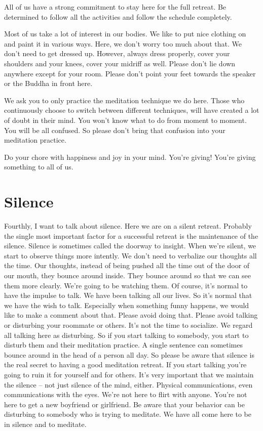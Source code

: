 \documentclass[letterpaper,10pt,english]{sphinxmanual}
\begin{document}
\sphinxAtStartPar
All of us have a strong commitment to stay here for the full retreat. Be
determined to follow all the activities and follow the schedule completely.

\sphinxAtStartPar
Most of us take a lot of interest in our bodies. We like to put nice clothing on and paint it in various ways. Here, we don’t worry too much about
that. We don’t need to get dressed up. However, always dress properly, cover
your shoulders and your knees, cover your midriff as well. Please don’t lie
down anywhere except for your room. Please don’t point your feet towards
the speaker or the Buddha in front here.

\sphinxAtStartPar
We  ask  you  to  only  practice  the  meditation  technique  we  do  here.
Those who continuously choose to switch between different techniques, will
have created a lot of doubt in their mind. You won’t know what to do from
moment to moment. You will be all confused. So please don’t bring that confusion into your meditation practice.

\sphinxAtStartPar
Do  your  chore  with  happiness  and  joy  in  your  mind. You’re  giving!
You’re giving something to all of us.


\section{Silence}
\label{\detokenize{0-a:silence}}
\sphinxAtStartPar
Fourthly, I want to talk about silence. Here we are on a silent retreat.
Probably the single most important factor for a successful retreat is the maintenance of the silence. Silence is sometimes called the doorway to insight.
When we’re silent, we start to observe things more intently. We don’t need
to verbalize our thoughts all the time. Our thoughts, instead of being pushed
all the time out of the door of our mouth, they bounce around inside. They
bounce around so that we can see them more clearly. We’re going to be watching them. Of course, it’s normal to have the impulse to talk. We have been
talking all our lives. So it’s normal that we have the wish to talk. Especially
when something funny happens, we would like to make a comment about
that. Please avoid doing that. Please avoid talking or disturbing your roommate or others. It’s not the time to socialize. We regard all talking here as
disturbing. So if you start talking to somebody, you start to disturb them and
their meditation practice. A single sentence can sometimes bounce around
   in the head of a person all day. So please be aware that silence is the real
secret to having a good meditation retreat. If you start talking you’re going
to ruin it for yourself and for others. It’s very important that we maintain the
silence – not just silence of the mind, either. Physical communications, even
communications with the eyes. We’re not here to flirt with anyone. You’re not
here to get a new boyfriend or girlfriend. Be aware that your behavior can be
disturbing to somebody who is trying to meditate. We have all come here to
be in silence and to meditate.
\end{document}

